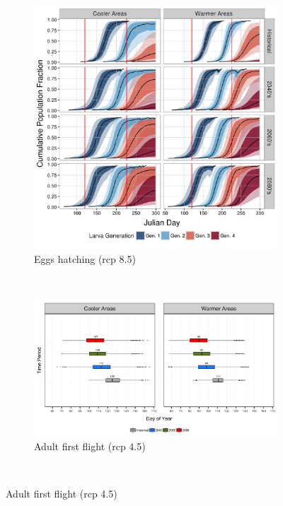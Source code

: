 \documentclass[12pt]{article}
\theoremstyle{plain}
\theoremstyle{definition}
\theoremstyle{definition}
\begin{document}
\begin{figure}[h!]
\begin{subfigure}[b]{0.43\textwidth}
        \includegraphics[width=\textwidth]{figures/plot_eggHatch_rcp85}
        \caption{Eggs hatching (rcp 8.5)}
        \label{fig:Eggs_Hatch_85}
    \end{subfigure}\\
    \vspace{.2in}
    \begin{subfigure}[b]{0.43\textwidth}
        \includegraphics[width=\textwidth]{figures/adult_emergence_rcp45}
        \caption{Adult first flight (rcp 4.5)}
        \label{fig:aff_45}
    \end{subfigure}
    ~ %

\end{figure}
\end{document}
